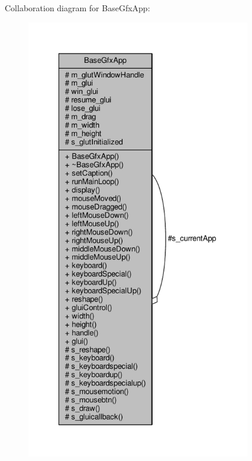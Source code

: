 Collaboration diagram for Base\-Gfx\-App\-:\nopagebreak
\begin{figure}[H]
\begin{center}
\leavevmode
\includegraphics[height=550pt]{classBaseGfxApp__coll__graph}
\end{center}
\end{figure}
